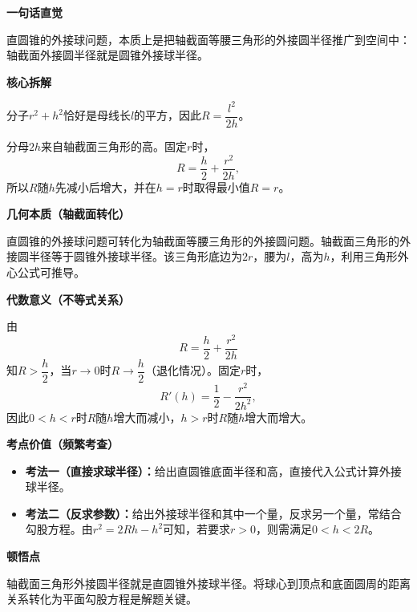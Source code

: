 \begin{explanationbox}

	\textbf{\textcolor{CExplanation}{一句话直觉}}

	直圆锥的外接球问题，本质上是把轴截面等腰三角形的外接圆半径推广到空间中：轴截面外接圆半径就是圆锥外接球半径。

	\medskip
	\textbf{\textcolor{CExplanation}{核心拆解}}
	\begin{description}[style=nextline, leftmargin=2.8em, labelsep=0.5em, itemsep=0.45em]
		\item[\textbf{要点一（分子含义）：}] 分子$r^2+h^2$恰好是母线长$l$的平方，因此$R = \dfrac{l^2}{2h}$。
		\item[\textbf{要点二（分母含义）：}] 分母$2h$来自轴截面三角形的高。固定$r$时，
		      \[
			      R=\frac{h}{2}+\frac{r^2}{2h},
		      \]
		      所以$R$随$h$先减小后增大，并在$h=r$时取得最小值$R=r$。
	\end{description}

	\medskip
	\textbf{\textcolor{CExplanation}{几何本质（轴截面转化）}}

	直圆锥的外接球问题可转化为轴截面等腰三角形的外接圆问题。轴截面三角形的外接圆半径等于圆锥外接球半径。该三角形底边为$2r$，腰为$l$，高为$h$，利用三角形外心公式可推导。

	\medskip
	\textbf{\textcolor{CExplanation}{代数意义（不等式关系）}}

	由
	\[
		R = \frac{h}{2} + \frac{r^2}{2h}
	\]
	知$R > \dfrac{h}{2}$，当$r \to 0$时$R \to \dfrac{h}{2}$（退化情况）。固定$r$时，
	\[
		R'(h)=\frac12-\frac{r^2}{2h^2},
	\]
	因此$0<h<r$时$R$随$h$增大而减小，$h>r$时$R$随$h$增大而增大。

	\medskip
	\textbf{\textcolor{CExplanation}{考点价值（频繁考查）}}
	\begin{itemize}[leftmargin=*, itemsep=0.5em, topsep=0.4em]
		\item \textbf{考法一（直接求球半径）：}给出直圆锥底面半径和高，直接代入公式计算外接球半径。
		\item \textbf{考法二（反求参数）：}给出外接球半径和其中一个量，反求另一个量，常结合勾股方程。由$r^2=2Rh-h^2$可知，若要求$r>0$，则需满足$0<h<2R$。
	\end{itemize}

	\medskip
	\textbf{\textcolor{CExplanation}{顿悟点}}

	轴截面三角形外接圆半径就是直圆锥外接球半径。将球心到顶点和底面圆周的距离关系转化为平面勾股方程是解题关键。


\end{explanationbox}
